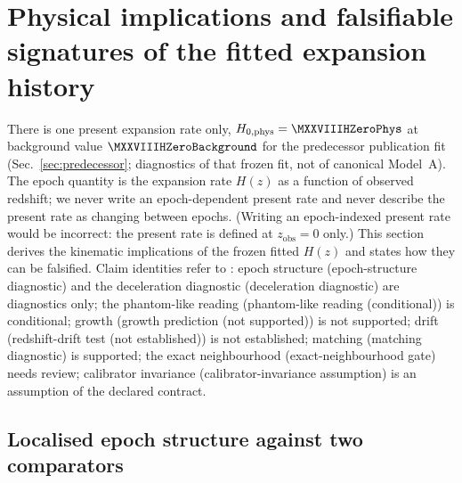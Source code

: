 \section{Physical implications and falsifiable signatures of the fitted expansion history}
\label{sec:implications}

There is one present expansion rate only,
$H_{0,\mathrm{phys}} = \MXXVIIIHZeroPhys$\kmsMpc{} at background value
$\MXXVIIIHZeroBackground$\kmsMpc{} for the predecessor publication
fit (Sec.~\ref{sec:predecessor}; diagnostics of that frozen fit, not
of canonical Model~A). The epoch quantity is the expansion
rate $H(z)$ as a function of observed redshift; we never write an
epoch-dependent present rate and never describe the present rate as
changing between epochs. (Writing an epoch-indexed present rate would be
incorrect: the present rate is defined at $z_{\mathrm{obs}} = 0$ only.)
This section derives the kinematic implications of the frozen fitted
$H(z)$ and states how they can be falsified. Claim identities refer to
: epoch structure (epoch-structure diagnostic) and the
deceleration diagnostic (deceleration diagnostic) are diagnostics only; the
phantom-like reading (phantom-like reading (conditional)) is conditional; growth
(growth prediction (not supported)) is not supported; drift (redshift-drift test (not established)) is
not established; matching (matching diagnostic) is supported; the exact
neighbourhood (exact-neighbourhood gate) needs review; calibrator invariance
(calibrator-invariance assumption) is an assumption of the declared contract.

\subsection{Localised epoch structure against two comparators}

